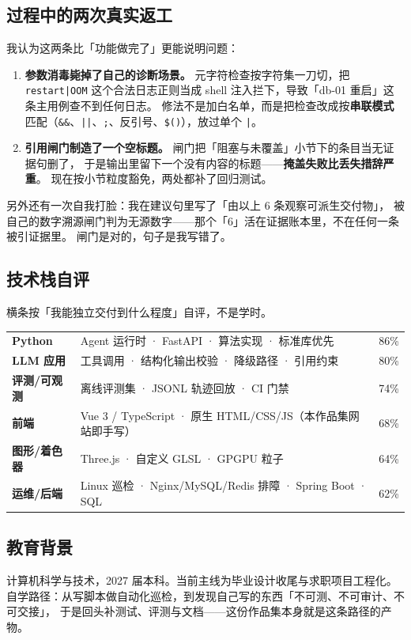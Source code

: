 \documentclass[10.5pt,a4paper]{article}
\begin{document}
\subsection{过程中的两次真实返工}
我认为这两条比「功能做完了」更能说明问题：
\begin{enumerate}
\item \textbf{参数消毒毙掉了自己的诊断场景。} 元字符检查按字符集一刀切，把 \texttt{restart|OOM}
  这个合法日志正则当成 shell 注入拦下，导致「db-01 重启」这条主用例查不到任何日志。
  修法不是加白名单，而是把检查改成按\textbf{串联模式}匹配（\texttt{\&\&}、\texttt{||}、\texttt{;}、反引号、\texttt{\$()}），放过单个 \texttt{|}。
\item \textbf{引用闸门制造了一个空标题。} 闸门把「阻塞与未覆盖」小节下的条目当无证据句删了，
  于是输出里留下一个没有内容的标题——\textbf{掩盖失败比丢失措辞严重}。
  现在按小节粒度豁免，两处都补了回归测试。
\end{enumerate}
另外还有一次自我打脸：我在建议句里写了「由以上 6 条观察可派生交付物」，
被自己的数字溯源闸门判为无源数字——那个「6」活在证据账本里，不在任何一条被引证据里。
闸门是对的，句子是我写错了。

\subsection{技术栈自评}
{\footnotesize\color{dim}横条按「我能独立交付到什么程度」自评，不是学时。\par}
\vspace{2pt}
\begin{tabularx}{\textwidth}{@{}L{2.7cm}Xr@{}}
\textbf{Python} & Agent 运行时 · FastAPI · 算法实现 · 标准库优先 & 86\%\\
\textbf{LLM 应用} & 工具调用 · 结构化输出校验 · 降级路径 · 引用约束 & 80\%\\
\textbf{评测/可观测} & 离线评测集 · JSONL 轨迹回放 · CI 门禁 & 74\%\\
\textbf{前端} & Vue 3 / TypeScript · 原生 HTML/CSS/JS（本作品集网站即手写） & 68\%\\
\textbf{图形/着色器} & Three.js · 自定义 GLSL · GPGPU 粒子 & 64\%\\
\textbf{运维/后端} & Linux 巡检 · Nginx/MySQL/Redis 排障 · Spring Boot · SQL & 62\%\\
\end{tabularx}

\subsection{教育背景}
计算机科学与技术，2027 届本科。当前主线为毕业设计收尾与求职项目工程化。
自学路径：从写脚本做自动化巡检，到发现自己写的东西「不可测、不可审计、不可交接」，
于是回头补测试、评测与文档——这份作品集本身就是这条路径的产物。
\end{document}
